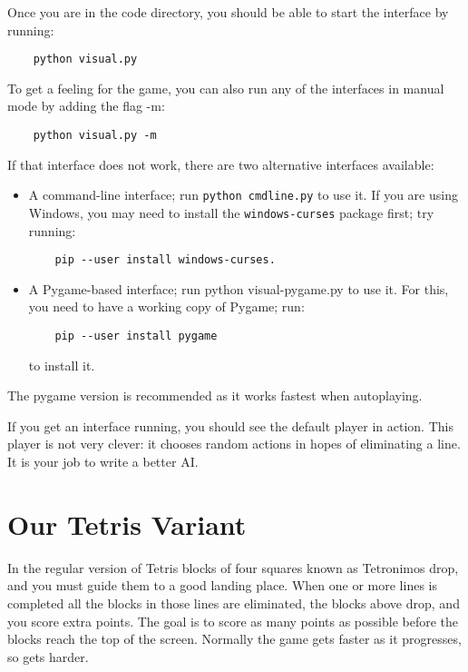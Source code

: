 \documentclass{article}
\begin{document}
Once you are in the code directory, you should be able to start the interface by running:
\begin{verbatim}
    python visual.py
\end{verbatim}
To get a feeling for the game, you can also run any of the interfaces in manual mode by adding the flag -m:
\begin{verbatim}
    python visual.py -m
\end{verbatim}
If that interface does not work, there are two alternative interfaces available:
\begin{itemize}   
\item A command-line interface; run \texttt{python cmdline.py} to use
  it. If you are using Windows, you may need to install the
  \texttt{windows-curses} package first; try running:
\begin{verbatim}
    pip --user install windows-curses.
\end{verbatim}
\item A Pygame-based interface; run python visual-pygame.py to use it. For this, you need to have a working
  copy of Pygame; run:
\begin{verbatim}
    pip --user install pygame
\end{verbatim}
to install it.
\end{itemize}

The pygame version is recommended as it works fastest when autoplaying.

If you get an interface running, you should see the default player in action. This player is not very clever: it chooses random actions in hopes of eliminating a line. It is your job to write a better AI.
 
\section{Our Tetris Variant}

In the regular version of Tetris blocks of four squares known as
Tetronimos drop, and you must guide them to a good landing place. When
one or more lines is completed all the blocks in those lines are
eliminated, the blocks above drop, and you score extra points. The
goal is to score as many points as possible before the blocks reach
the top of the screen. Normally the game gets faster as it progresses,
so gets harder.
\end{document}
